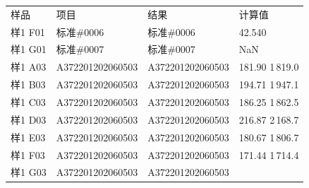 \documentclass[UTF8,10pt,a4paper,fontset=fandol]{ctexart}
\newcommand{\fieldvalue}[1]{#1}
\begin{document}
\begin{tabular}{@{}llll@{}}
样品 & 项目 & 结果 & 计算值\\
样1 F01 & 标准\#0006 &
\fieldvalue{标准\#0006} &
\fieldvalue{42.540}\\
样1 G01 & 标准\#0007 &
\fieldvalue{标准\#0007} &
\fieldvalue{NaN}\\
样1 A03 & A372201202060503 &
\fieldvalue{A372201202060503} &
\fieldvalue{181.90}
\quad
\fieldvalue{1\,819.0}\\
样1 B03 & A372201202060503 &
\fieldvalue{A372201202060503} &
\fieldvalue{194.71}
\quad
\fieldvalue{1\,947.1}\\
样1 C03 & A372201202060503 &
\fieldvalue{A372201202060503} &
\fieldvalue{186.25}
\quad
\fieldvalue{1\,862.5}\\
样1 D03 & A372201202060503 &
\fieldvalue{A372201202060503} &
\fieldvalue{216.87}
\quad
\fieldvalue{2\,168.7}\\
样1 E03 & A372201202060503 &
\fieldvalue{A372201202060503} &
\fieldvalue{180.67}
\quad
\fieldvalue{1\,806.7}\\
样1 F03 & A372201202060503 &
\fieldvalue{A372201202060503} &
\fieldvalue{171.44}
\quad
\fieldvalue{1\,714.4}\\
样1 G03 & A372201202060503 &
\fieldvalue{A372201202060503} &

\end{tabular}
\end{document}
